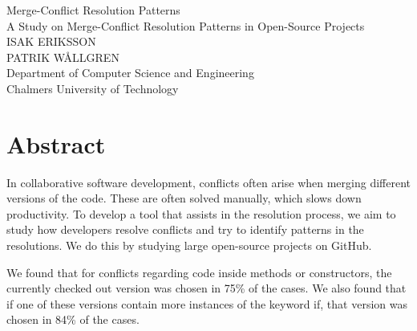 Merge-Conflict Resolution Patterns\\
A Study on Merge-Conflict Resolution Patterns in Open-Source Projects\\
ISAK ERIKSSON\\
PATRIK WÅLLGREN\\
Department of Computer Science and Engineering\\
Chalmers University of Technology \setlength{\parskip}{0.5cm}

\thispagestyle{plain}			%
\section*{Abstract}
In collaborative software development, conflicts often arise when merging different versions of the code. These are often solved manually, which slows down productivity. To develop a tool that assists in the resolution process, we aim to study how developers resolve conflicts and try to identify patterns in the resolutions. We do this by studying large open-source projects on GitHub.

We found that for conflicts regarding code inside methods or constructors, the currently checked out version was chosen in 75\% of the cases. We also found that if one of these versions contain more instances of the keyword if, that version was chosen in 84\% of the cases.


\newpage				%
\thispagestyle{empty}
\mbox{}